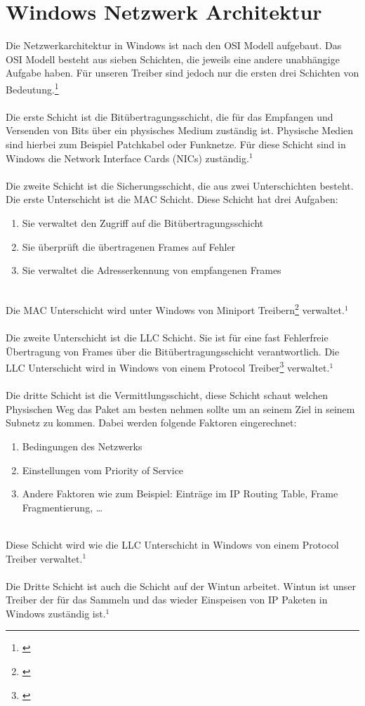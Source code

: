 \section{Windows Netzwerk Architektur}

Die Netzwerkarchitektur in Windows ist nach den OSI Modell aufgebaut. Das OSI Modell besteht aus sieben Schichten, die jeweils eine andere unabhängige Aufgabe haben. Für unseren Treiber sind jedoch nur die ersten drei Schichten von Bedeutung.\footnote[1]{\cite[Vgl.][]{27}}
\\\\
Die erste Schicht ist die Bitübertragungsschicht, die für das Empfangen und Versenden von Bits über ein physisches Medium zuständig ist. Physische Medien sind hierbei zum Beispiel Patchkabel oder Funknetze. Für diese Schicht sind in Windows die Network Interface Cards (NICs) zuständig.$^{1}$
\\\\
Die zweite Schicht ist die Sicherungsschicht, die aus zwei Unterschichten besteht. Die erste Unterschicht ist die MAC Schicht. Diese Schicht hat drei Aufgaben:
\\
\begin{enumerate}
    \item Sie verwaltet den Zugriff auf die Bitübertragungsschicht
    \item Sie überprüft die übertragenen Frames auf Fehler
    \item Sie verwaltet die Adresserkennung von empfangenen Frames
\end{enumerate}
\ \\
Die MAC Unterschicht wird unter Windows von Miniport Treibern\footnote[3]{\cite[Vgl.][]{25}} verwaltet.$^{1}$
\\\\
Die zweite Unterschicht ist die LLC Schicht. Sie ist für eine fast Fehlerfreie Übertragung von Frames über die Bitübertragungsschicht verantwortlich. Die LLC Unterschicht wird in Windows von einem Protocol Treiber\footnote[5]{\cite[Vgl.][]{26}} verwaltet.$^{1}$
\\\\
Die dritte Schicht ist die Vermittlungsschicht, diese Schicht schaut welchen Physischen Weg das Paket am besten nehmen sollte um an seinem Ziel in seinem Subnetz zu kommen. Dabei werden folgende Faktoren eingerechnet:
\\
\begin{enumerate}
    \item Bedingungen des Netzwerks
    \item Einstellungen vom Priority of Service
    \item Andere Faktoren wie zum Beispiel: Einträge im IP Routing Table, Frame Fragmentierung, …
\end{enumerate}
\ \\
Diese Schicht wird wie die LLC Unterschicht in Windows von einem Protocol Treiber verwaltet.$^{1}$
\\\\
Die Dritte Schicht ist auch die Schicht auf der Wintun arbeitet. Wintun ist unser Treiber der für das Sammeln und das wieder Einspeisen von IP Paketen in Windows zuständig ist.$^{1}$

